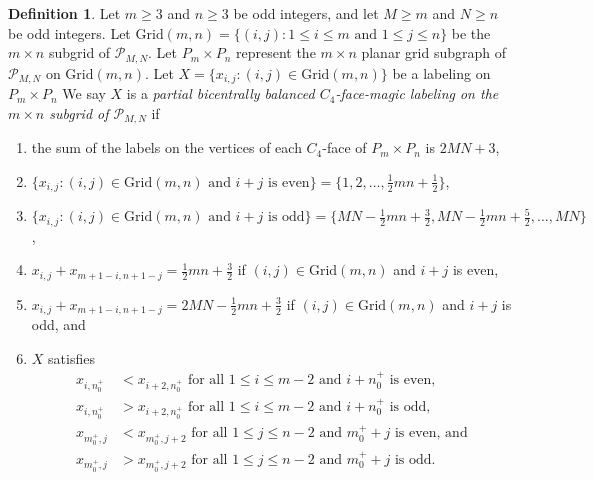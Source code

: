 \documentclass[12pt]{amsart}
\theoremstyle{definition}
\newtheorem{definition}{Definition}
\theoremstyle{plain}
\begin{document}
\begin{definition} \label{defnPartialLabelings}
  Let $m\geqslant 3$ and $n \geqslant 3$ be odd integers, and let $M \geqslant m$ and $N \geqslant n$ be odd integers.
  Let $\mathrm{Grid}(m,n) =\{ (i,j) : 1 \leqslant i \leqslant m \mbox{ and } 1 \leqslant j \leqslant n \}$ be the
  $m \times n$ subgrid of $\mathcal{P}_{M,N}$.
  Let $P_m \times P_n$ represent the $m \times  n$ planar grid subgraph of $\mathcal{P}_{M,N}$ on $\mathrm{Grid}(m,n)$.
  Let $X= \{ x_{i,j} : (i,j)\in \mathrm{Grid}(m,n) \}$ be a labeling on $P_m \times P_n$
  We say $X$ is a \textit{partial bicentrally balanced $C_4$-face-magic labeling on the $m \times n$ subgrid of $\mathcal{P}_{M,N}$} if
  \begin{enumerate}
    \item the sum of the labels on the vertices of each $C_4$-face of $P_m \times P_n$ is $2MN+3$,
    \item $\{ x_{i,j} : (i,j) \in \mathrm{Grid}(m,n) \mbox{ and } i+j \mbox{ is even}\} = \{ 1,2,\ldots,\tfrac{1}{2}mn+\frac{1}{2}\}$,
    \item $\{ x_{i,j} : (i,j) \in \mathrm{Grid}(m,n) \mbox{ and } i+j \mbox{ is odd}\} = \{ MN- \tfrac{1}{2}mn + \tfrac{3}{2}, MN- \tfrac{1}{2}mn + \tfrac{5}{2},\ldots,MN\}$,
    \item $x_{i,j}+ x_{m+1-i,n+1-j} = \tfrac{1}{2} mn+ \tfrac{3}{2}$ if $(i,j)\in\mathrm{Grid}(m,n)$ and $i+j$ is even,
    \item $x_{i,j}+ x_{m+1-i,n+1-j} = 2MN - \tfrac{1}{2} mn + \tfrac{3}{2}$ if $(i,j)\in\mathrm{Grid}(m,n)$ and $i+j$ is odd, and
    \item $X$ satisfies
    \begin{align*}
    x_{i,n_0^{+}} &<  x_{i+2,n_0^{+}} \mbox{ \ for all } 1 \leqslant i \leqslant m-2 \mbox{ and } i+ n^{+}_0 \mbox{ is even,}  \\
    x_{i,n_0^{+}} &>  x_{i+2,n_0^{+}} \mbox{ \ for all } 1 \leqslant i \leqslant m-2 \mbox{ and } i+ n^{+}_0 \mbox{ is odd,}  \\
    x_{m_0^{+},j} &<  x_{m_0^{+},j+2} \mbox{ \ for all } 1 \leqslant j \leqslant n-2 \mbox{ and } m^{+}_0 +j \mbox{ is even, and} \\
    x_{m_0^{+},j} &>  x_{m_0^{+},j+2} \mbox{ \ for all } 1 \leqslant j \leqslant n-2 \mbox{ and } m^{+}_0 +j \mbox{ is odd.}
  \end{align*}
  \end{enumerate}
\end{definition}
\end{document}
